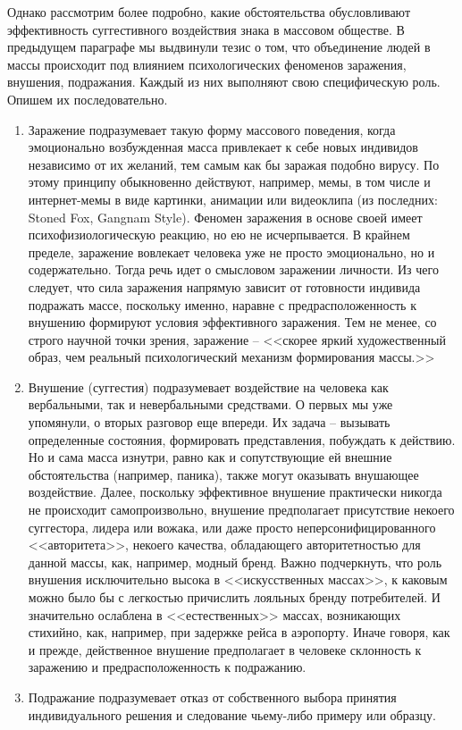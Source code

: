 Однако рассмотрим более подробно, какие обстоятельства обусловливают эффективность
суггестивного воздействия знака в массовом обществе. В предыдущем параграфе мы выдвинули тезис о том, что объединение людей в массы
происходит под влиянием психологических феноменов заражения, внушения, подражания.
Каждый из них выполняют свою специфическую роль. Опишем их последовательно.
\begin{enumerate}
    \item Заражение подразумевает такую форму массового поведения, когда
    эмоционально возбужденная масса привлекает к себе новых индивидов независимо
    от их желаний, тем самым как бы заражая подобно вирусу.
    \autocite{freid_mass}\autocite{petrovsky1990}\autocite{porshnev1979}\autocite{olshansky}
    По этому принципу обыкновенно действуют, например, мемы, в том числе и интернет-мемы в
    виде картинки, анимации или видеоклипа (из последних: Stoned Fox, Gangnam Style). Феномен заражения в
    основе своей имеет психофизиологическую реакцию, но ею не исчерпывается.
    В крайнем пределе, заражение вовлекает человека уже не просто эмоционально,
    но и содержательно. Тогда речь идет о смысловом заражении личности.
    Из чего следует, что сила заражения напрямую зависит от готовности индивида
    подражать массе, поскольку именно, наравне с предрасположенность к внушению
    формируют условия эффективного заражения. Тем не менее, со строго научной точки
    зрения, заражение -- <<скорее яркий художественный образ, чем реальный
    психологический механизм формирования массы.>>\autocite[][86]{olshansky}

    \item Внушение (суггестия) подразумевает воздействие на человека как вербальными,
    так и невербальными средствами. О первых мы уже упомянули, о вторых разговор еще
    впереди. Их задача -- вызывать определенные состояния, формировать представления,
    побуждать к действию. Но и сама масса изнутри, равно как и сопутствующие ей
    внешние обстоятельства (например, паника), также могут оказывать внушающее
    воздействие.\autocite{behterev1898}\autocite{porshnev1979} Далее, поскольку эффективное
    внушение практически никогда не происходит самопроизвольно, внушение предполагает
    присутствие некоего суггестора, лидера или вожака, или даже просто
    неперсонифицированного <<авторитета>>, некоего качества, обладающего
    авторитетностью для данной массы, как, например, модный бренд.
    Важно подчеркнуть, что роль внушения исключительно высока в <<искусственных массах>>\autocite[][69]{freid_mass}, к каковым можно было
    бы с легкостью причислить лояльных бренду потребителей. И значительно
    ослаблена в <<естественных>> массах, возникающих стихийно, как, например,
    при задержке рейса в аэропорту. Иначе говоря, как и прежде, действенное внушение
    предполагает в человеке склонность к заражению и предрасположенность к подражанию.

    \item Подражание подразумевает отказ от собственного выбора принятия
    индивидуального решения и следование чьему-либо примеру или образцу.
\end{enumerate}
